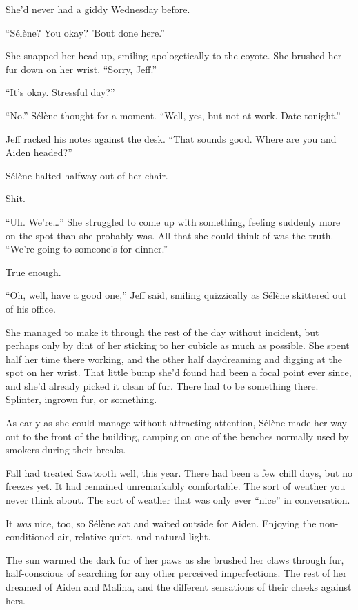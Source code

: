 She'd never had a giddy Wednesday before.

``Sélène? You okay? 'Bout done here.''

She snapped her head up, smiling apologetically to the coyote. She brushed her fur down on her wrist. ``Sorry, Jeff.''

``It's okay. Stressful day?''

``No.'' Sélène thought for a moment. ``Well, yes, but not at work. Date tonight.''

Jeff racked his notes against the desk. ``That sounds good. Where are you and Aiden headed?''

Sélène halted halfway out of her chair.

Shit.

``Uh. We're\ldots{}'' She struggled to come up with something, feeling suddenly more on the spot than she probably was. All that she could think of was the truth. ``We're going to someone's for dinner.''

True enough.

``Oh, well, have a good one,'' Jeff said, smiling quizzically as Sélène skittered out of his office.

She managed to make it through the rest of the day without incident, but perhaps only by dint of her sticking to her cubicle as much as possible. She spent half her time there working, and the other half daydreaming and digging at the spot on her wrist. That little bump she'd found had been a focal point ever since, and she'd already picked it clean of fur. There had to be something there. Splinter, ingrown fur, or something.

As early as she could manage without attracting attention, Sélène made her way out to the front of the building, camping on one of the benches normally used by smokers during their breaks.

Fall had treated Sawtooth well, this year. There had been a few chill days, but no freezes yet. It had remained unremarkably comfortable. The sort of weather you never think about. The sort of weather that was only ever ``nice'' in conversation.

It \emph{was} nice, too, so Sélène sat and waited outside for Aiden. Enjoying the non-conditioned air, relative quiet, and natural light.

The sun warmed the dark fur of her paws as she brushed her claws through fur, half-conscious of searching for any other perceived imperfections. The rest of her dreamed of Aiden and Malina, and the different sensations of their cheeks against hers.


